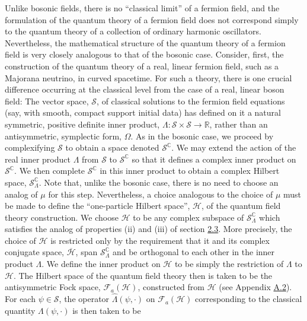 \documentclass[11pt,a4paper]{article}
\begin{document}
Unlike bosonic fields, there is no ``classical limit'' of a fermion field, and the formulation of the quantum theory of a fermion field does not correspond simply to the quantum theory of a collection of ordinary harmonic oscillators. Nevertheless, the mathematical structure of the quantum theory of a fermion field is very closely analogous to that of the bosonic case. Consider, first, the construction of the quantum theory of a real, linear fermion field, such as a Majorana neutrino, in curved spacetime. For such a theory, there is one crucial difference occurring at the classical level from the case of a real, linear boson field: The vector space, \(\mathcal{S}\), of classical solutions to the fermion field equations (say, with smooth, compact support initial data) has defined on it a natural symmetric, positive definite inner product, \(\Lambda: \mathcal{S} \times \mathcal{S} \to \mathbb{R}\), rather than an antisymmetric, symplectic form, \(\Omega\). As in the bosonic case, we proceed by complexifying \(\mathcal S\) to obtain a space denoted \(\mathcal S^{\mathbb C}\). We may extend the action of the real inner product \(\Lambda\) from \(\mathcal{S}\) to \(\mathcal{S}^{\mathbb{C}}\) so that it defines a complex inner product on \(\mathcal{S}^{\mathbb C}\). We then complete \(\mathcal{S}^{\mathbb C}\) in this inner product to obtain a complex Hilbert space, \(\mathcal{S}_{\Lambda}^{\mathbb C}\). Note that, unlike the bosonic case, there is no need to choose an analog of \(\mu\) for this step. Nevertheless, a choice analogous to the choice of \(\mu\) must be made to define the ``one-particle Hilbert space'', \(\mathcal{H}\), of the quantum field theory construction. We choose \(\mathcal{H}\) to be any complex subspace of \(\mathcal{S}_{\Lambda}^{\mathbb C}\) which satisfies the analog of properties (ii) and (iii) of section \hyperlink{sec:2.3}{2.3}. More precisely, the choice of \(\mathcal{H}\) is restricted only by the requirement that it and its complex conjugate space, \(\overline{\mathcal{H}}\), span \(\mathcal{S}_{\Lambda}^{\mathbb{C}}\) and be orthogonal to each other in the inner product \(\Lambda\). We define the inner product on \(\mathcal{H}\) to be simply the restriction of \(\Lambda\) to \(\mathcal{H}\). The Hilbert space of the quantum field theory then is taken to be the antisymmetric Fock space, \(\mathcal{F}_a(\mathcal{H})\), constructed from \(\mathcal{H}\) (see Appendix \hyperlink{sec:A.2}{A.2}). For each \(\psi \in \mathcal{S}\), the operator \(\hat{\Lambda}(\psi, \cdot)\) on \(\mathcal{F}_{a}(\mathcal{H})\) corresponding to the classical quantity \(\Lambda(\psi,\cdot)\) is then taken to be
\end{document}

